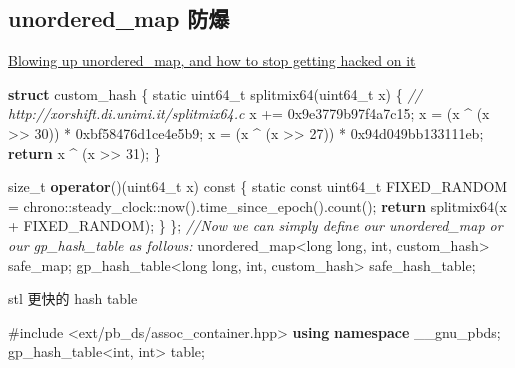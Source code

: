 \documentclass[
]{article}
\newenvironment{Shaded}{}{}
\newcommand{\AttributeTok}[1]{\textcolor[rgb]{0.49,0.56,0.16}{#1}}
\newcommand{\BaseNTok}[1]{\textcolor[rgb]{0.25,0.63,0.44}{#1}}
\newcommand{\CommentTok}[1]{\textcolor[rgb]{0.38,0.63,0.69}{\textit{#1}}}
\newcommand{\ControlFlowTok}[1]{\textcolor[rgb]{0.00,0.44,0.13}{\textbf{#1}}}
\newcommand{\DataTypeTok}[1]{\textcolor[rgb]{0.56,0.13,0.00}{#1}}
\newcommand{\DecValTok}[1]{\textcolor[rgb]{0.25,0.63,0.44}{#1}}
\newcommand{\ImportTok}[1]{#1}
\newcommand{\KeywordTok}[1]{\textcolor[rgb]{0.00,0.44,0.13}{\textbf{#1}}}
\newcommand{\NormalTok}[1]{#1}
\newcommand{\PreprocessorTok}[1]{\textcolor[rgb]{0.74,0.48,0.00}{#1}}
\begin{document}
\hypertarget{unordered_map-ux9632ux7206}{%
\subsection{unordered\_map 防爆}\label{unordered_map-ux9632ux7206}}

\href{https://codeforces.com/blog/entry/62393}{Blowing up
unordered\_map, and how to stop getting hacked on it}

\begin{Shaded}
\begin{Highlighting}[]
\KeywordTok{struct}\NormalTok{ custom\_hash \{}
    \AttributeTok{static} \DataTypeTok{uint64\_t}\NormalTok{ splitmix64(}\DataTypeTok{uint64\_t}\NormalTok{ x) \{}
        \CommentTok{// http://xorshift.di.unimi.it/splitmix64.c}
\NormalTok{        x += }\BaseNTok{0x9e3779b97f4a7c15}\NormalTok{;}
\NormalTok{        x = (x \^{} (x \textgreater{}\textgreater{} }\DecValTok{30}\NormalTok{)) * }\BaseNTok{0xbf58476d1ce4e5b9}\NormalTok{;}
\NormalTok{        x = (x \^{} (x \textgreater{}\textgreater{} }\DecValTok{27}\NormalTok{)) * }\BaseNTok{0x94d049bb133111eb}\NormalTok{;}
        \ControlFlowTok{return}\NormalTok{ x \^{} (x \textgreater{}\textgreater{} }\DecValTok{31}\NormalTok{);}
\NormalTok{    \}}

    \DataTypeTok{size\_t} \KeywordTok{operator}\NormalTok{()(}\DataTypeTok{uint64\_t}\NormalTok{ x) }\AttributeTok{const}\NormalTok{ \{}
        \AttributeTok{static} \AttributeTok{const} \DataTypeTok{uint64\_t}\NormalTok{ FIXED\_RANDOM = chrono::steady\_clock::now().time\_since\_epoch().count();}
        \ControlFlowTok{return}\NormalTok{ splitmix64(x + FIXED\_RANDOM);}
\NormalTok{    \}}
\NormalTok{\};}
\CommentTok{//Now we can simply define our unordered\_map or our gp\_hash\_table as follows:}
\NormalTok{unordered\_map\textless{}}\DataTypeTok{long} \DataTypeTok{long}\NormalTok{, }\DataTypeTok{int}\NormalTok{, custom\_hash\textgreater{} safe\_map;}
\NormalTok{gp\_hash\_table\textless{}}\DataTypeTok{long} \DataTypeTok{long}\NormalTok{, }\DataTypeTok{int}\NormalTok{, custom\_hash\textgreater{} safe\_hash\_table;}
\end{Highlighting}
\end{Shaded}

stl 更快的 hash table

\begin{Shaded}
\begin{Highlighting}[]
\PreprocessorTok{\#include }\ImportTok{\textless{}ext/pb\_ds/assoc\_container.hpp\textgreater{}}
\KeywordTok{using} \KeywordTok{namespace}\NormalTok{ \_\_gnu\_pbds;}
\NormalTok{gp\_hash\_table\textless{}}\DataTypeTok{int}\NormalTok{, }\DataTypeTok{int}\NormalTok{\textgreater{} table;}
\end{Highlighting}
\end{Shaded}
\end{document}
